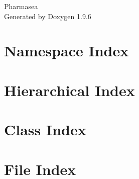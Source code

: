 \documentclass[twoside]{book}
\newcommand{\+}{\discretionary{\mbox{\scriptsize$\hookleftarrow$}}{}{}}
\newcommand{\clearemptydoublepage}{%
    \newpage{\pagestyle{empty}\cleardoublepage}%
  }
\begin{document}
  \raggedbottom
    \hypersetup{pageanchor=false,
                bookmarksnumbered=true,
                pdfencoding=unicode
               }
  \begin{titlepage}
  \vspace*{7cm}
  \begin{center}%
  {\Large Pharmasea}\\
  \vspace*{1cm}
  {\large Generated by Doxygen 1.9.6}\\
  \end{center}
  \end{titlepage}
  \clearemptydoublepage
  \tableofcontents
  \clearemptydoublepage
  \hypersetup{pageanchor=true}
\chapter{Namespace Index}

\chapter{Hierarchical Index}

\chapter{Class Index}

\chapter{File Index}

\end{document}
